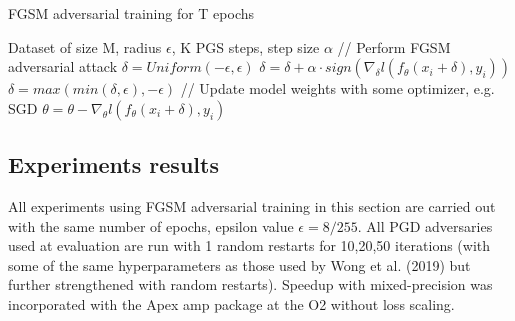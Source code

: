 \documentclass{article}
\begin{document}
\begin{algorithm}[H]
	\caption{FGSM adversarial training for T epochs}
	\begin{algorithmic}[1]
		\Require Dataset of size M, radius $\epsilon$, K PGS steps, step size
		$\alpha$   \State // Perform FGSM
		adversarial attack \State $\delta = Uniform(-\epsilon, \epsilon)$ \State
		$\delta = \delta + \alpha \cdot sign(\nabla_{\delta} l(f_{\theta}(x_i +
		\delta), y_i))$ \State $\delta = max(min(\delta, \epsilon), -\epsilon)$
		\State // Update model weights with some optimizer, e.g. SGD \State $\theta
		= \theta - \nabla_{\theta} l(f_{\theta}(x_i + \delta), y_i)$ \EndFor \EndFor
	\end{algorithmic}
\end{algorithm}

\subsection{Experiments results}

All experiments using FGSM adversarial training in this section are carried out
with the same number of epochs, epsilon value $\epsilon = 8/255$. All PGD
adversaries used at evaluation are run with 1 random restarts for 10,20,50
iterations (with some of the same hyperparameters as those used by Wong et al.
(2019) but further strengthened with random restarts). Speedup with
mixed-precision was incorporated with the Apex amp package at the O2 without
loss scaling.
\end{document}
